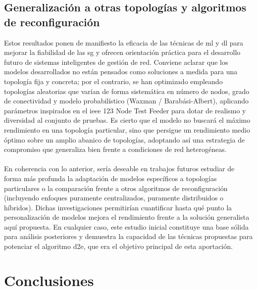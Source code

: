 \subsection{Generalización a otras topologías y algoritmos de reconfiguración}

Estos resultados ponen de manifiesto la eficacia de las técnicas de \gls{ml} y \gls{dl} para mejorar la fiabilidad de las \gls{sg} y ofrecen orientación práctica para el desarrollo futuro de sistemas inteligentes de gestión de red. Conviene aclarar que los modelos desarrollados no están pensados como soluciones a medida para una topología fija y concreta; por el contrario, se han optimizado empleando topologías aleatorias que varían de forma sistemática en número de nodos, grado de conectividad y modelo probabilístico (Waxman / Barabási-Albert), aplicando parámetros inspirados en el \gls{ieee} 123 Node Test Feeder para dotar de realismo y diversidad al conjunto de pruebas. Es cierto que el modelo no buscará el máximo rendimiento en una topología particular, sino que persigue un rendimiento medio óptimo sobre un amplio abanico de topologías, adoptando así una estrategia de compromiso que generaliza bien frente a condiciones de red heterogéneas.\\
\\
En coherencia con lo anterior, sería deseable en trabajos futuros estudiar de forma más profunda la adaptación de modelos específicos a topologías particulares o la comparación frente a otros algoritmos de reconfiguración (incluyendo enfoques puramente centralizados, puramente distribuidos o híbridos). Dichas investigaciones permitirían cuantificar hasta qué punto la personalización de modelos mejora el rendimiento frente a la solución generalista aquí propuesta. En cualquier caso, este estudio inicial constituye una base sólida para análisis posteriores y demuestra la capacidad de las técnicas propuestas para potenciar el algoritmo \gls{d2e}, que era el objetivo principal de esta aportación.

\section{Conclusiones}
\label{sec:conclufault}

